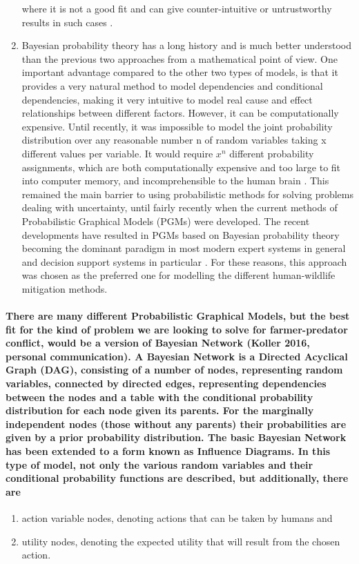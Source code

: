 \begin{enumerate}
where it is not a good fit and can give counter-intuitive or untrustworthy
results in such cases \citep{Josang_et_al_2010}.
\item Bayesian probability theory has a long history and is much better
understood than the previous two approaches from a mathematical point
of view. One important advantage compared to the other two types of
models, is that it provides a very natural method to model dependencies
and conditional dependencies, making it very intuitive to model real
cause and effect relationships between different factors. However,
it can be computationally expensive. Until recently, it was impossible
to model the joint probability distribution over any reasonable number
n of random variables taking x different values per variable. It would
require $x^{n}$ different probability assignments, which are both
computationally expensive and too large to fit into computer memory,
and incomprehensible to the human brain \citep{Koller_n_Friedman_2005}.
This remained the main barrier to using probabilistic methods for
solving problems dealing with uncertainty, until fairly recently when
the current methods of Probabilistic Graphical Models (PGMs) were
developed. The recent developments have resulted in PGMs based on
Bayesian probability theory becoming the dominant paradigm in most
modern expert systems in general and decision support systems in particular
\citep{Koller_n_Friedman_2005}. For these reasons, this approach
was chosen as the preferred one for modelling the different human-wildlife
mitigation methods.
\end{enumerate}

\paragraph{There are many different Probabilistic Graphical Models, but the
best fit for the kind of problem we are looking to solve for farmer-predator
conflict, would be a version of Bayesian Network (Koller 2016, personal
communication). A Bayesian Network is a Directed Acyclical Graph (DAG),
consisting of a number of nodes, representing random variables, connected
by directed edges, representing dependencies between the nodes and
a table with the conditional probability distribution for each node
given its parents. For the marginally independent nodes (those without
any parents) their probabilities are given by a prior probability
distribution. The basic Bayesian Network has been extended to a form
known as Influence Diagrams. In this type of model, not only the various
random variables and their conditional probability functions are described,
but additionally, there are }
\begin{enumerate}
\item action variable nodes, denoting actions that can be taken by humans
and 
\item utility nodes, denoting the expected utility that will result from
the chosen action.
\end{enumerate}


